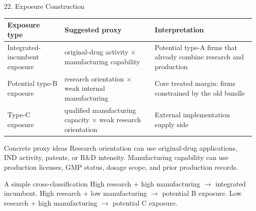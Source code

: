 \documentclass[aspectratio=169,11pt]{beamer}
\begin{document}
\begin{frame}{22. Exposure Construction}
\footnotesize
\begin{center}
\begin{tabular}{p{}p{}p{}}
\toprule
\textbf{Exposure type} & \textbf{Suggested proxy} & \textbf{Interpretation} \\
\midrule
Integrated-incumbent exposure & original-drug activity $\times$ manufacturing capability & Potential type-A firms that already combine research and production \\
Potential type-B exposure & research orientation $\times$ weak internal manufacturing & Core treated margin: firms constrained by the old bundle \\
Type-C exposure & qualified manufacturing capacity $\times$ weak research orientation & External implementation supply side \\
\bottomrule
\end{tabular}
\end{center}

\vspace{0.15cm}
\begin{block}{Concrete proxy ideas}
Research orientation can use original-drug applications, IND activity, patents, or R\&D intensity. Manufacturing capability can use production licenses, GMP status, dosage scope, and prior production records.
\end{block}

\begin{block}{A simple cross-classification}
High research + high manufacturing $\rightarrow$ integrated incumbent.\newline
High research + low manufacturing $\rightarrow$ potential B exposure.\newline
Low research + high manufacturing $\rightarrow$ potential C exposure.
\end{block}
\end{frame}
\end{document}
